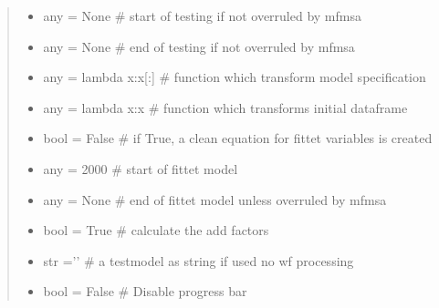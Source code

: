 \documentclass[letterpaper,10pt,english]{sphinxmanual}
\begin{document}
\begin{fulllineitems}
\begin{quote}
\begin{description}
\begin{itemize}
\item {} 
\sphinxAtStartPar
{} \textendash{} any = None    \# start of testing if not overruled by mfmsa

\item {} 
\sphinxAtStartPar
{} \textendash{} any = None    \# end of testing if not overruled by mfmsa

\item {} 
\sphinxAtStartPar
{} \textendash{} any = lambda x:x{[}:{]}    \# function which transform model specification

\item {} 
\sphinxAtStartPar
{} \textendash{} any = lambda x:x     \# function which transforms initial dataframe

\item {} 
\sphinxAtStartPar
{} \textendash{} bool = False \# if True, a clean equation for fittet variables is created

\item {} 
\sphinxAtStartPar
{} \textendash{} any = 2000   \# start of fittet model

\item {} 
\sphinxAtStartPar
{} \textendash{} any = None  \# end of fittet model unless overruled by mfmsa

\item {} 
\sphinxAtStartPar
{} \textendash{} bool = True  \# calculate the add factors

\item {} 
\sphinxAtStartPar
{} \textendash{} str =’’    \# a testmodel as string if used no wf processing

\item {} 
\sphinxAtStartPar
{} \textendash{} bool = False \# Disable progress bar

\end{itemize}

\end{description}\end{quote}


\end{fulllineitems}
\end{document}
